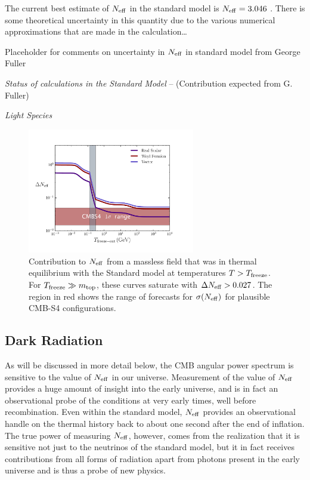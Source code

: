 The current best estimate of $N_{\rm eff}$ in the standard model is $N_{\rm eff} = 3.046$ \cite{Mangano:2005cc}.  There is some theoretical uncertainty in this quantity due to the various numerical approximations that are made in the calculation\ldots
\begin{center}
{\color{blue}Placeholder for comments on uncertainty in $N_{\rm eff}$ in standard model from George Fuller}
\end{center}



{\it Status of calculations in the Standard Model} -- (Contribution expected from G. Fuller)


{\it Light Species}

\begin{figure}[t!]
\begin{center}
\includegraphics[width=0.65\textwidth]{Neutrinos/Neff.pdf}
\caption{Contribution to $N_{\rm eff}$ from a massless field that was in thermal equilibrium with the Standard model at temperatures $T> T_{\rm freeze}$.  For $T_{\rm freeze} \gg m_{\rm top}$, these curves saturate with $\Delta N_{\rm eff} > 0.027$.   The region in red shows the range of forecasts for $\sigma(N_{\rm eff})$ for plausible CMB-S4 configurations. }
\label{fig:limits}
\end{center}
\end{figure}

\subsection{Dark Radiation}

As will be discussed in more detail below, the CMB angular power spectrum is sensitive to the value of $N_{\rm eff}$ in our universe.  Measurement of the value of $N_{\rm eff}$ provides a huge amount of insight into the early universe, and is in fact an observational probe of the conditions at very early times, well before recombination.  Even within the standard model, $N_{\rm eff}$ provides an observational handle on the thermal history back to about one second after the end of inflation.  The true power of measuring $N_{\rm eff}$, however, comes from the realization that it is sensitive not just to the neutrinos of the standard model, but it in fact receives contributions from all forms of radiation apart from photons present in the early universe and is thus a probe of new physics.

